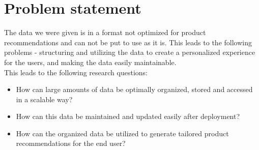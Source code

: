 \section{Problem statement}
The data we were given is in a format not optimized for product recommendations and can not be put to use as it is. This leads to the following problems - structuring and utilizing the data to create a personalized experience for the users, and making the data easily maintainable. \\
This leads to the following research questions:
\begin{itemize}
\item How can large amounts of data be optimally organized, stored and accessed in a scalable way?
\item How can this data be maintained and updated easily after deployment?
\item How can the organized data be utilized to generate tailored product recommendations for the end user?
\end{itemize}
